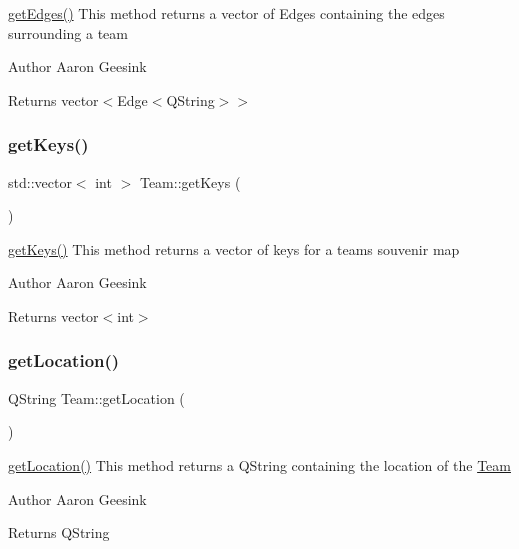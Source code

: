 \mbox{\hyperlink{class_team_a04db74ce13bfe7c9d9fdf133920b5d72}{get\+Edges()}} This method returns a vector of Edges containing the edges surrounding a team 

\begin{DoxyAuthor}{Author}
Aaron Geesink 
\end{DoxyAuthor}
\begin{DoxyReturn}{Returns}
vector$<$Edge$<$\+Q\+String$>$$>$ 
\end{DoxyReturn}
\mbox{\label{class_team_ab7ed1cd5a51fb12b70e029bf50336050}} 
\subsubsection{\texorpdfstring{getKeys()}{getKeys()}}
{\footnotesize\ttfamily std\+::vector$<$ int $>$ Team\+::get\+Keys (\begin{DoxyParamCaption}{ }\end{DoxyParamCaption})}



\mbox{\hyperlink{class_team_ab7ed1cd5a51fb12b70e029bf50336050}{get\+Keys()}} This method returns a vector of keys for a team\textquotesingle{}s souvenir map 

\begin{DoxyAuthor}{Author}
Aaron Geesink 
\end{DoxyAuthor}
\begin{DoxyReturn}{Returns}
vector$<$int$>$ 
\end{DoxyReturn}
\mbox{\label{class_team_a111f7ada960236792e4a82e1e5612d0b}} 
\subsubsection{\texorpdfstring{getLocation()}{getLocation()}}
{\footnotesize\ttfamily Q\+String Team\+::get\+Location (\begin{DoxyParamCaption}{ }\end{DoxyParamCaption})}



\mbox{\hyperlink{class_team_a111f7ada960236792e4a82e1e5612d0b}{get\+Location()}} This method returns a Q\+String containing the location of the \mbox{\hyperlink{class_team}{Team}} 

\begin{DoxyAuthor}{Author}
Aaron Geesink 
\end{DoxyAuthor}
\begin{DoxyReturn}{Returns}
Q\+String 
\end{DoxyReturn}
\mbox{\label{class_team_a369e1504be751aa8bf1445a69901e9da}} 
